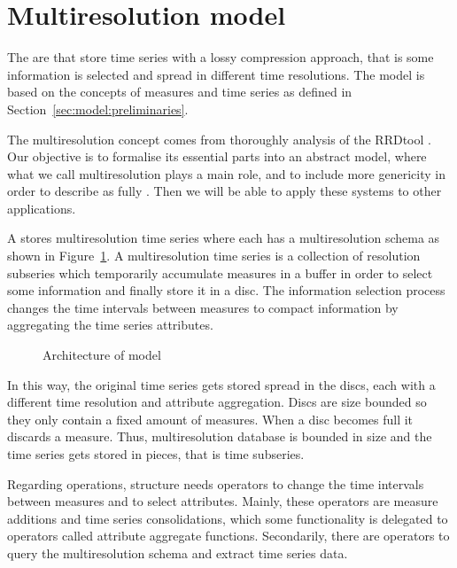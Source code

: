 \section{Multiresolution model}
\label{sec:MTSMS}

The  are  that store time series with a lossy
compression approach, that is some information is selected and spread in
different time resolutions. The  model is based on the
concepts of measures and time series as defined in
Section~\ref{sec:model:preliminaries}.


The multiresolution concept comes from thoroughly analysis of the
RRDtool \cite{rrdtool} . Our objective is to formalise its
essential parts into an abstract model, where what we call
multiresolution plays a main role, and to include more genericity in
order to describe  as fully . Then we will be
able to apply these systems to other applications.


A  stores multiresolution time series where each has a
multiresolution schema as shown in Figure~\ref{fig:model:mtsdb}. A
multiresolution time series is a collection of resolution subseries
which temporarily accumulate measures in a buffer in order to select
some information and finally store it in a disc. The information
selection process changes the time intervals between measures to
compact information by aggregating the time series attributes. 

\begin{figure}
  \centering
  
  \caption{Architecture of  model}
  \label{fig:model:mtsdb}
\end{figure}


In this way, the original time series gets stored spread in the discs,
each with a different time resolution and attribute aggregation.
Discs are size bounded so they only contain a fixed amount of
measures. When a disc becomes full it discards a measure. Thus,
multiresolution database is bounded in size and the time series gets
stored in pieces, that is time subseries.

Regarding operations,  structure needs operators to change
the time intervals between measures and to select attributes. Mainly,
these operators are measure additions and time series consolidations,
which some functionality is delegated to operators called attribute
aggregate functions. Secondarily, there are operators to query the
multiresolution schema and extract time series data.


